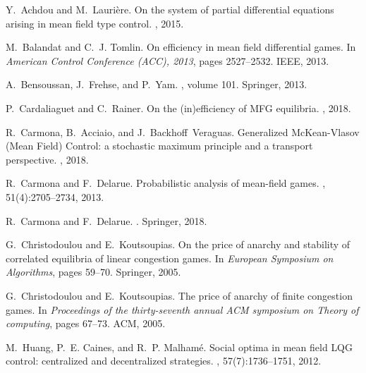 \documentclass[11pt]{article}
\begin{document}
\begin{thebibliography}{10}

Y.~Achdou and M.~Lauri\`{e}re.
\newblock On the system of partial differential equations arising in mean field
  type control.
, 2015.

M.~Balandat and C.~J. Tomlin.
\newblock On efficiency in mean field differential games.
\newblock In {\em American Control Conference (ACC), 2013}, pages 2527--2532.
  IEEE, 2013.

A.~Bensoussan, J.~Frehse, and P.~Yam.
, volume
  101.
\newblock Springer, 2013.

P.~Cardaliaguet and C.~Rainer.
\newblock On the (in)efficiency of {MFG} equilibria.
, 2018.

R.~Carmona, B.~Acciaio, and J.~Backhoff~Veraguas.
\newblock Generalized {M}c{K}ean-{V}lasov ({M}ean {F}ield) {C}ontrol: a
  stochastic maximum principle and a transport perspective.
, 2018.

R.~Carmona and F.~Delarue.
\newblock Probabilistic analysis of mean-field games.
, 51(4):2705--2734,
  2013.

R.~Carmona and F.~Delarue.
.
\newblock Springer, 2018.

G.~Christodoulou and E.~Koutsoupias.
\newblock On the price of anarchy and stability of correlated equilibria of
  linear congestion games.
\newblock In {\em European Symposium on Algorithms}, pages 59--70. Springer,
  2005.

G.~Christodoulou and E.~Koutsoupias.
\newblock The price of anarchy of finite congestion games.
\newblock In {\em Proceedings of the thirty-seventh annual ACM symposium on
  Theory of computing}, pages 67--73. ACM, 2005.

M.~Huang, P.~E. Caines, and R.~P. Malham{\'e}.
\newblock Social optima in mean field {LQG} control: centralized and
  decentralized strategies.
, 57(7):1736--1751, 2012.


\end{thebibliography}
\end{document}
